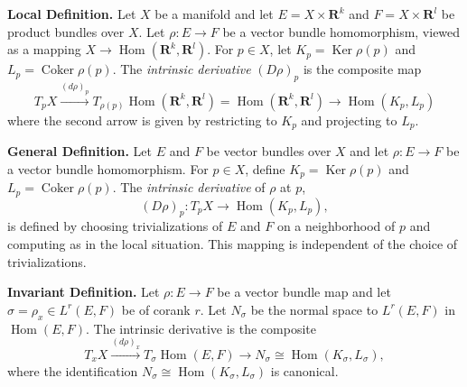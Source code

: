 \textbf{Local Definition.}
Let $X$ be a manifold and let $E = X \times \mathbf{R}^k$ and $F = X \times \mathbf{R}^l$ be product bundles over $X$. Let $\rho : E \to F$ be a vector bundle homomorphism, viewed as a mapping $X \to \operatorname{Hom}(\mathbf{R}^k, \mathbf{R}^l)$. For $p \in X$, let $K_p = \operatorname{Ker} \rho(p)$ and $L_p = \operatorname{Coker} \rho(p)$. The \emph{intrinsic derivative} $(D\rho)_p$ is the composite map
$$
T_p X \xrightarrow{(d\rho)_p} T_{\rho(p)} \operatorname{Hom}(\mathbf{R}^k, \mathbf{R}^l) = \operatorname{Hom}(\mathbf{R}^k, \mathbf{R}^l) \longrightarrow \operatorname{Hom}(K_p, L_p)
$$
where the second arrow is given by restricting to $K_p$ and projecting to $L_p$.

\textbf{General Definition.}
Let $E$ and $F$ be vector bundles over $X$ and let $\rho : E \to F$ be a vector bundle homomorphism. For $p \in X$, define $K_p = \operatorname{Ker} \rho(p)$ and $L_p = \operatorname{Coker} \rho(p)$. The \emph{intrinsic derivative} of $\rho$ at $p$,
$$
(D\rho)_p : T_p X \longrightarrow \operatorname{Hom}(K_p, L_p),
$$
is defined by choosing trivializations of $E$ and $F$ on a neighborhood of $p$ and computing as in the local situation. This mapping is independent of the choice of trivializations.

\textbf{Invariant Definition.}
Let $\rho : E \to F$ be a vector bundle map and let $\sigma = \rho_x \in L^r(E, F)$ be of corank $r$. Let $N_\sigma$ be the normal space to $L^r(E, F)$ in $\operatorname{Hom}(E, F)$. The intrinsic derivative is the composite
$$
T_x X \xrightarrow{(d\rho)_x} T_\sigma \operatorname{Hom}(E, F) \longrightarrow N_\sigma \cong \operatorname{Hom}(K_\sigma, L_\sigma),
$$
where the identification $N_\sigma \cong \operatorname{Hom}(K_\sigma, L_\sigma)$ is canonical.
